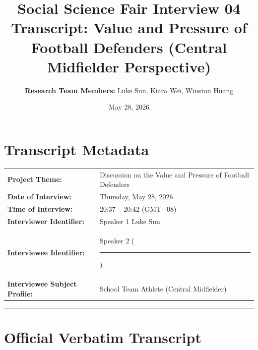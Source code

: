 \documentclass[11pt,a4paper]{article}
\title{\textbf{Social Science Fair Interview 04 \\ Transcript: Value and Pressure of Football Defenders (Central Midfielder Perspective)}}
\author{\textbf{Research Team Members:} Luke Sun, Kiara Wei, Winston Huang}
\date{May 28, 2026}
\newcommand{\redacted}{\rule{2.5cm}{2ex}}
\begin{document}
\maketitle

\section*{Transcript Metadata}
\begin{tabular}{ll}
    \textbf{Project Theme:} & Discussion on the Value and Pressure of Football Defenders \\
    \textbf{Date of Interview:} & Thursday, May 28, 2026 \\
    \textbf{Time of Interview:} & 20:37 -- 20:42 (GMT+08) \\
    \textbf{Interviewer Identifier:} & Speaker 1 Luke Sun\\
    \textbf{Interviewee Identifier:} & Speaker 2 (\redacted) \\
    \textbf{Interviewee Subject Profile:} & School Team Athlete (Central Midfielder)
\end{tabular}

\vspace{2em}
\hrule
\vspace{1.5em}

\section*{Official Verbatim Transcript}
\end{document}
